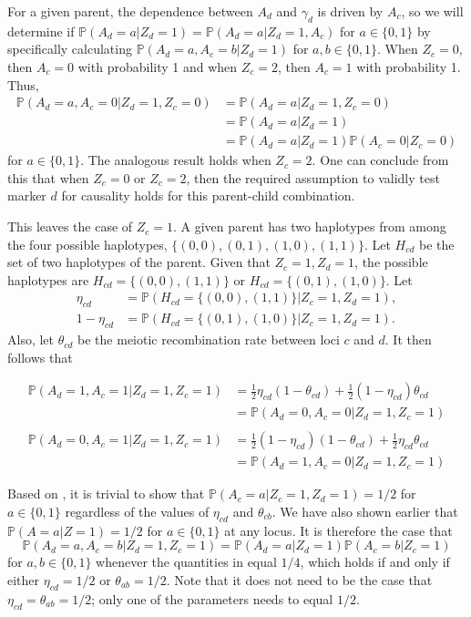 \documentclass[12pt]{extarticle}
\newcommand{\pp}{\mathbb{P}}
\begin{document}
{For a given parent, the dependence between $A_d$ and $\gamma_d$ is driven by $A_c$, so we will determine if $\pp(A_d = a | Z_d = 1) = \pp(A_d = a | Z_d = 1, A_c)$ for $a \in \{0,1\}$ by specifically calculating $\pp(A_d = a, A_c=b | Z_d = 1)$ for $a, b \in \{0,1\}$. When $Z_c = 0$, then $A_c=0$ with probability 1 and when $Z_c = 2$, then $A_c=1$ with probability 1. Thus, 
\begin{align*}\pp(A_d = a, A_c=0 | Z_d = 1, Z_c=0) & = \pp(A_d = a | Z_d = 1, Z_c=0) \\
 & = \pp(A_d = a | Z_d = 1) \\
 & = \pp(A_d = a | Z_d = 1) \pp(A_c = 0 | Z_c = 0) 
\end{align*}
for $a \in \{0, 1\}$. The analogous result holds when $Z_c = 2$. One can conclude from this that when $Z_c = 0$ or $Z_c = 2$, then the required assumption to validly test marker $d$ for causality holds for this parent-child combination. 

This leaves the case of $Z_c = 1$. A given parent has two haplotypes from among the four possible haplotypes, $\{(0,0), (0,1), (1,0), (1,1)\}$. Let $H_{cd}$ be the set of two haplotypes of the parent. Given that $Z_c = 1, Z_d = 1$, the possible haplotypes are $H_{cd} = \{(0,0), (1,1)\}$ or $H_{cd} = \{(0,1), (1,0)\}$. Let 
\begin{align*}\eta_{cd} & = \pp(H_{cd} = \{(0,0), (1,1)\} | Z_c = 1, Z_d = 1), \\
1- \eta_{cd} & = \pp(H_{cd} = \{(0,1), (1,0)\} | Z_c = 1, Z_d = 1).
\end{align*}
Also, let $\theta_{cd}$ be the meiotic recombination rate between loci $c$ and $d$. It then follows that

\begin{equation} \label{eq:jointprobs}
\begin{aligned}
\pp(A_d = 1, A_c = 1 | Z_d = 1, Z_c = 1) & = \frac{1}{2} \eta_{cd} (1 - \theta_{cd}) + \frac{1}{2} (1-\eta_{cd}) \theta_{cd} \\
 & =  \pp(A_d = 0, A_c = 0 | Z_d = 1, Z_c = 1) \\
 &  \\
\pp(A_d = 0, A_c = 1 | Z_d = 1, Z_c = 1) & = \frac{1}{2} (1-\eta_{cd}) (1 - \theta_{cd}) + \frac{1}{2} \eta_{cd} \theta_{cd} \\
 & =  \pp(A_d = 1, A_c = 0 | Z_d = 1, Z_c = 1) 
  \end{aligned}
\end{equation}

Based on , it is trivial to show that $\pp(A_c = a | Z_c = 1, Z_d = 1) = 1/2$ for $a \in \{0, 1\}$ regardless of the values of $\eta_{cd}$ and $\theta_{cb}$. We have also shown earlier that $\pp(A = a | Z = 1) = 1/2$ for $a \in \{0, 1\}$ at any locus. It is therefore the case that 
\begin{equation*}
\pp(A_d = a, A_c = b | Z_d = 1, Z_c = 1) = \pp(A_d = a | Z_d = 1) \pp(A_c = b | Z_c = 1)
\end{equation*}
for $a, b \in \{0, 1\}$ whenever the quantities in  equal $1/4$, which holds if and only if either $\eta_{cd} = 1/2$ or $\theta_{ab} = 1/2$. Note that it does not need to be the case that $\eta_{cd} = \theta_{ab} = 1/2$; only one of the parameters needs to equal $1/2$.

}
\end{document}
